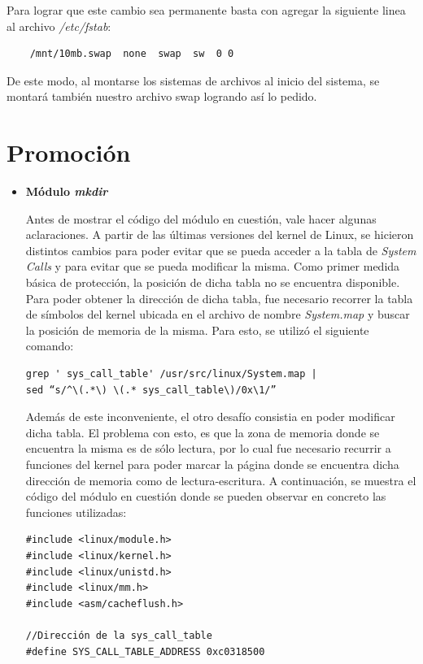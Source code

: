 \documentclass[a4paper,11pt] {article}
\begin{document}
\begin{enumerate}
	Para lograr que este cambio sea permanente basta con agregar la siguiente linea al archivo \textit{/etc/fstab}: 
	\begin{verbatim}
	/mnt/10mb.swap  none  swap  sw  0 0
	\end{verbatim}
	De este modo, al montarse los sistemas de archivos al inicio del sistema, se montará también nuestro archivo swap logrando así lo pedido.
 
\end{enumerate}

\section*{Promoción}

\begin{itemize}
	\item \textbf{Módulo \textit{mkdir}}

	Antes de mostrar el código del módulo en cuestión, vale hacer algunas aclaraciones. A partir de las últimas versiones del kernel de Linux, se hicieron distintos cambios para poder evitar que se pueda acceder a la tabla de \textit{System Calls} y para evitar que se pueda modificar la misma. Como primer medida básica de protección, la posición de dicha tabla no se encuentra disponible. Para poder obtener la dirección de dicha tabla, fue necesario recorrer la tabla de símbolos del kernel ubicada en el archivo de nombre \textit{System.map} y buscar la posición de memoria de la misma. Para esto, se utilizó el siguiente comando:

\begin{verbatim}
grep ' sys_call_table' /usr/src/linux/System.map |
sed “s/^\(.*\) \(.* sys_call_table\)/0x\1/”
\end{verbatim}

	Además de este inconveniente, el otro desafío consistia en poder modificar dicha tabla. El problema con esto, es que la zona de memoria donde se encuentra la misma es de sólo lectura, por lo cual fue necesario recurrir a funciones del kernel para poder marcar la página donde se encuentra dicha dirección de memoria como de lectura-escritura. A continuación, se muestra el código del módulo en cuestión donde se pueden observar en concreto las funciones utilizadas:

\begin{verbatim}
#include <linux/module.h>
#include <linux/kernel.h>
#include <linux/unistd.h>
#include <linux/mm.h>
#include <asm/cacheflush.h>

//Dirección de la sys_call_table
#define SYS_CALL_TABLE_ADDRESS 0xc0318500


\end{verbatim}
\end{itemize}
\end{document}
